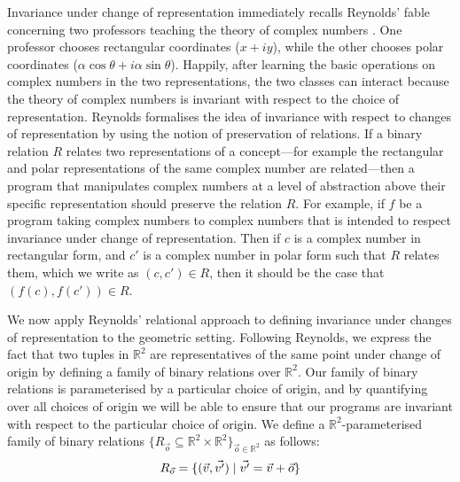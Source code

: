 


Invariance under change of representation immediately recalls
Reynolds' fable concerning two professors teaching the theory of
complex numbers \cite{reynolds83types}. One professor chooses
rectangular coordinates ($x + iy$), while the other chooses polar
coordinates ($\alpha\cos\theta + i\alpha\sin\theta$). Happily, after
learning the basic operations on complex numbers in the two
representations, the two classes can interact because the theory of
complex numbers is invariant with respect to the choice of
representation. Reynolds formalises the idea of invariance with
respect to changes of representation by using the notion of
preservation of relations. If a binary relation $R$ relates two
representations of a concept---for example the rectangular and polar
representations of the same complex number are related---then a
program that manipulates complex numbers at a level of abstraction
above their specific representation should preserve the relation
$R$. For example, if $f$ be a program taking complex numbers to
complex numbers that is intended to respect invariance under change of
representation. Then if $c$ is a complex number in rectangular form,
and $c'$ is a complex number in polar form such that $R$ relates them,
which we write as $(c,c') \in R$, then it should be the case that
$(f(c), f(c')) \in R$.

We now apply Reynolds' relational approach to defining invariance
under changes of representation to the geometric setting. Following
Reynolds, we express the fact that two tuples in $\mathbb{R}^2$ are
representatives of the same point under change of origin by defining a
family of binary relations over $\mathbb{R}^2$. Our family of binary
relations is parameterised by a particular choice of origin, and by
quantifying over all choices of origin we will be able to ensure that
our programs are invariant with respect to the particular choice of
origin. We define a $\mathbb{R}^2$-parameterised family of binary
relations $\{ R_{\vec{o}} \subseteq \mathbb{R}^2 \times \mathbb{R}^2
\}_{\vec{o} \in \mathbb{R}^2}$ as follows:
\begin{displaymath}
  R_{\vec{o}} = \{ (\vec{v}, \vec{v'}) \mathrel| \vec{v'} = \vec{v} + \vec{o} \}
\end{displaymath}

